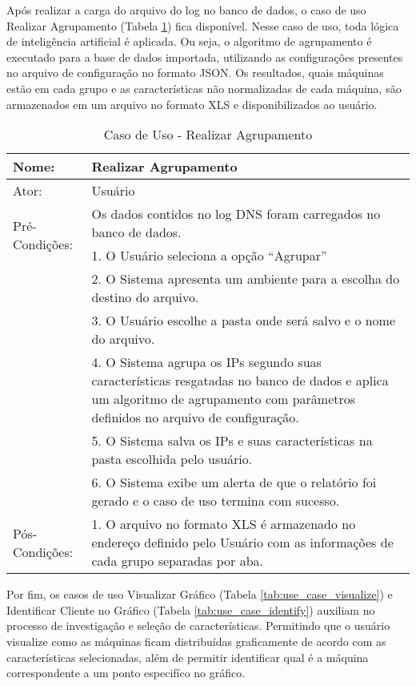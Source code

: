 Após realizar a carga do arquivo do log no banco de dados, o caso de uso Realizar Agrupamento (Tabela \ref{tab:use_case_clustering}) fica disponível. Nesse caso de uso, toda lógica de inteligência artificial é aplicada. Ou seja, o algoritmo de agrupamento é executado para a base de dados importada, utilizando as configurações presentes no arquivo de configuração no formato JSON. Os resultados, quais máquinas estão em cada grupo e as características não normalizadas de cada máquina, são armazenados em um arquivo no formato XLS e disponibilizados ao usuário.

\begin{table}[]
\centering
\caption{Caso de Uso - Realizar Agrupamento}
\label{tab:use_case_clustering}
\begin{tabular}{|lp{10cm}|}
\hline
Nome: & Realizar Agrupamento  \\ \hline
Ator: & Usuário   \\ \hline
\multirow{2}{*}{Pré-Condições:} & Os dados contidos no log DNS foram carregados no banco de dados.  \\ \hline
\multirow{13}{*}{Fluxo Básico de Eventos:} & 1. O Usuário seleciona a opção ``Agrupar''  \\
 & 2. O Sistema apresenta um ambiente para a escolha do destino do arquivo. \\
 & 3. O Usuário escolhe a pasta onde será salvo e o nome do arquivo. \\
 & 4. O Sistema agrupa os IPs segundo suas características resgatadas no banco de dados e aplica um algoritmo de agrupamento com parâmetros definidos no arquivo de configuração.  \\
 & 5. O Sistema salva os IPs e suas características na pasta escolhida pelo usuário. \\
 & 6. O Sistema exibe um alerta de que o relatório foi gerado e o caso de uso termina com sucesso. \\
 \hline
\multirow{3}{*}{Pós-Condições:} & 1. O arquivo no formato XLS é armazenado no endereço definido pelo Usuário com as informações de cada grupo separadas por aba. \\
\hline
\end{tabular}
\end{table}

Por fim, os casos de uso Visualizar Gráfico (Tabela \ref{tab:use_case_visualize}) e Identificar Cliente no Gráfico (Tabela \ref{tab:use_case_identify}) auxiliam no processo de investigação e seleção de características. Permitindo que o usuário visualize como as máquinas ficam distribuídas graficamente de acordo com as características selecionadas, além de permitir identificar qual é a máquina correspondente a um ponto especifíco no gráfico.

